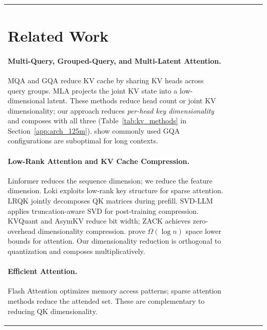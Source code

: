 \documentclass[11pt]{article}
\begin{document}
\begin{table}[h]
\begin{tabular}{lccccc}
\section{Related Work}

\paragraph{Multi-Query, Grouped-Query, and Multi-Latent Attention.}
MQA \citep{shazeer2019fast} and GQA \citep{ainslie2023gqa} reduce KV cache by sharing KV heads across query groups. MLA \citep{liu2024deepseek} projects the joint KV state into a low-dimensional latent. These methods reduce head count or joint KV dimensionality; our approach reduces \emph{per-head key dimensionality} and composes with all three (Table~\ref{tab:kv_methods} in Section~\ref{app:arch_125m}). \citet{costoptimalgqa2025} show commonly used GQA configurations are suboptimal for long contexts.

\paragraph{Low-Rank Attention and KV Cache Compression.}
Linformer \citep{wang2020linformer} reduces the sequence dimension; we reduce the feature dimension. Loki \citep{loki2024} exploits low-rank key structure for sparse attention. LRQK \citep{lrqk2025} jointly decomposes QK matrices during prefill. SVD-LLM \citep{svdllm2025} applies truncation-aware SVD for post-training compression. KVQuant \citep{kvquant2024} and AsymKV \citep{asymkv2024} reduce bit width; ZACK \citep{zack2025} achieves zero-overhead dimensionality compression. \citet{compressionbarriers2025} prove $\Omega(\log n)$ space lower bounds for attention. Our dimensionality reduction is orthogonal to quantization and composes multiplicatively.

\paragraph{Efficient Attention.}
Flash Attention \citep{dao2022flashattention, flashattention32024} optimizes memory access patterns; sparse attention methods \citep{child2019generating, beltagy2020longformer, saap2025} reduce the attended set. These are complementary to reducing QK dimensionality.



\end{tabular}
\end{table}
\end{document}
